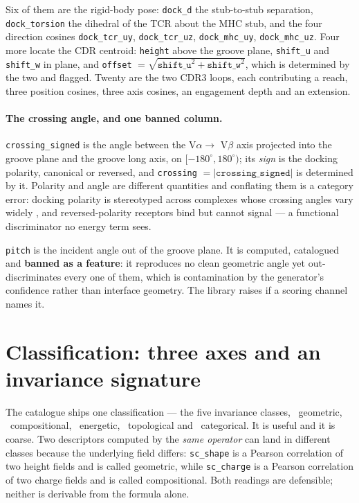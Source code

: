 \documentclass[11pt,a4paper]{article}
\newcommand{\dsc}[1]{\texttt{#1}}
\begin{document}
Six of them are the rigid-body pose: \dsc{dock\_d} the stub-to-stub separation, \dsc{dock\_torsion}
the dihedral of the TCR about the MHC stub, and the four direction cosines \dsc{dock\_tcr\_uy},
\dsc{dock\_tcr\_uz}, \dsc{dock\_mhc\_uy}, \dsc{dock\_mhc\_uz}. Four more locate the CDR centroid:
\dsc{height} above the groove plane, \dsc{shift\_u} and \dsc{shift\_w} in plane, and
\dsc{offset} $= \sqrt{\dsc{shift\_u}^2 + \dsc{shift\_w}^2}$, which is determined by the two and
flagged. Twenty are the two CDR3 loops, each contributing a reach, three position cosines, three
axis cosines, an engagement depth and an extension.

\paragraph{The crossing angle, and one banned column.} \dsc{crossing\_signed} is the angle between
the V$\alpha \to$ V$\beta$ axis projected into the groove plane and the groove long axis, on
$[-180^\circ, 180^\circ)$; its \emph{sign} is the docking polarity, canonical or reversed, and
\dsc{crossing} $= |\dsc{crossing\_signed}|$ is determined by it. Polarity and angle are different
quantities and conflating them is a category error: docking polarity is stereotyped across complexes
whose crossing angles vary widely \cite{Feng2007}, and reversed-polarity receptors bind but cannot
signal \cite{Zareie2021} --- a functional discriminator no energy term sees.

\dsc{pitch} is the incident angle out of the groove plane. It is computed, catalogued and
\textbf{banned as a feature}: it reproduces no clean geometric angle yet out-discriminates every one
of them, which is contamination by the generator's confidence rather than interface geometry. The
library raises if a scoring channel names it.

\section{Classification: three axes and an invariance signature}
\label{sec:classification}

The catalogue ships one classification --- the five invariance classes, \nInvGeometric\ geometric,
\nInvCompositional\ compositional, \nInvEnergetic\ energetic, \nInvTopological\ topological and
\nInvCategorical\ categorical. It is useful and it is coarse. Two descriptors computed by the
\emph{same operator} can land in different classes because the underlying field differs:
\dsc{sc\_shape} is a Pearson correlation of two height fields and is called geometric, while
\dsc{sc\_charge} is a Pearson correlation of two charge fields and is called compositional. Both
readings are defensible; neither is derivable from the formula alone.
\end{document}
